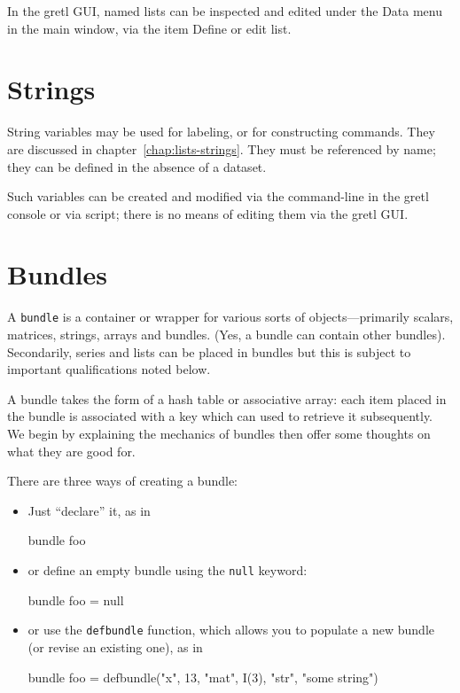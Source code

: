 In the gretl GUI, named lists can be inspected and edited under the
\textsf{Data} menu in the main window, via the item \textsf{Define or
  edit list}.

\section{Strings}
\label{sec:Strings}

String variables may be used for labeling, or for constructing
commands. They are discussed in chapter~\ref{chap:lists-strings}. They
must be referenced by name; they can be defined in the absence of a
dataset.

Such variables can be created and modified via the command-line in
the gretl console or via script; there is no means of editing them
via the gretl GUI.

\section{Bundles}
\label{sec:Bundles}

A \texttt{bundle} is a container or wrapper for various sorts of
objects---primarily scalars, matrices, strings, arrays and
bundles. (Yes, a bundle can contain other bundles). Secondarily,
series and lists can be placed in bundles but this is subject to
important qualifications noted below.

A bundle takes the form of a hash table or associative array: each
item placed in the bundle is associated with a key which can used to
retrieve it subsequently. We begin by explaining the mechanics of
bundles then offer some thoughts on what they are good for.

There are three ways of creating a bundle:
\begin{itemize}
\item Just ``declare'' it, as in
\begin{code}
bundle foo
\end{code}
\item or define an empty bundle using the \texttt{null} keyword:
\begin{code}
bundle foo = null
\end{code}
\item or use the \texttt{defbundle} function, which allows you to
  populate a new bundle (or revise an existing one), as in
\begin{code}
bundle foo = defbundle("x", 13, "mat", I(3), "str", "some string")
\end{code}
\end{itemize}

